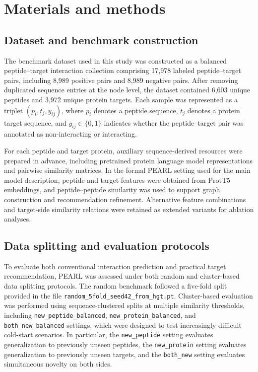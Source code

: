 
\section{Materials and methods}

\subsection{Dataset and benchmark construction}

The benchmark dataset used in this study was constructed as a balanced peptide--target interaction collection comprising 17,978 labeled peptide--target pairs, including 8,989 positive pairs and 8,989 negative pairs. After removing duplicated sequence entries at the node level, the dataset contained 6,603 unique peptides and 3,972 unique protein targets. Each sample was represented as a triplet $(p_i, t_j, y_{ij})$, where $p_i$ denotes a peptide sequence, $t_j$ denotes a protein target sequence, and $y_{ij} \in \{0,1\}$ indicates whether the peptide--target pair was annotated as non-interacting or interacting.

For each peptide and target protein, auxiliary sequence-derived resources were prepared in advance, including pretrained protein language model representations and pairwise similarity matrices. In the formal PEARL setting used for the main model description, peptide and target features were obtained from ProtT5 embeddings, and peptide--peptide similarity was used to support graph construction and recommendation refinement. Alternative feature combinations and target-side similarity relations were retained as extended variants for ablation analyses.

\subsection{Data splitting and evaluation protocols}

To evaluate both conventional interaction prediction and practical target recommendation, PEARL was assessed under both random and cluster-based data splitting protocols. The random benchmark followed a five-fold split provided in the file \texttt{random\_5fold\_seed42\_from\_hgt.pt}. Cluster-based evaluation was performed using sequence-clustered splits at multiple similarity thresholds, including \texttt{new\_peptide\_balanced}, \texttt{new\_protein\_balanced}, and \texttt{both\_new\_balanced} settings, which were designed to test increasingly difficult cold-start scenarios. In particular, the \texttt{new\_peptide} setting evaluates generalization to previously unseen peptides, the \texttt{new\_protein} setting evaluates generalization to previously unseen targets, and the \texttt{both\_new} setting evaluates simultaneous novelty on both sides.

